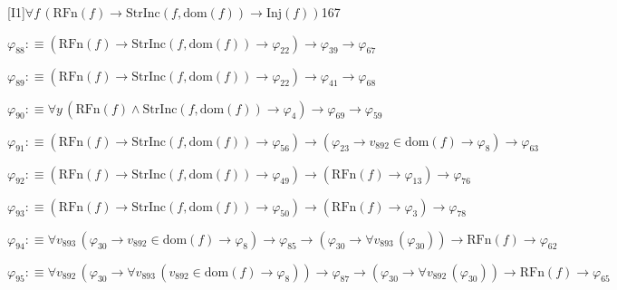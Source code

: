 \begin{fullproof}{[I1]}{$\forall f\,(\mathrm{RFn}(f) \to \mathrm{StrInc}(f,\mathrm{dom}(f)) \to \mathrm{Inj}(f))$}{167}
\begin{abbrevlist}
\item $\varphi_{88} :\equiv (\mathrm{RFn}(f) \to \mathrm{StrInc}(f,\mathrm{dom}(f)) \to \varphi_{22}) \to \varphi_{39} \to \varphi_{67}$
\item $\varphi_{89} :\equiv (\mathrm{RFn}(f) \to \mathrm{StrInc}(f,\mathrm{dom}(f)) \to \varphi_{22}) \to \varphi_{41} \to \varphi_{68}$
\item $\varphi_{90} :\equiv \forall y\,(\mathrm{RFn}(f) \land \mathrm{StrInc}(f,\mathrm{dom}(f)) \to \varphi_{4}) \to \varphi_{69} \to \varphi_{59}$
\item $\varphi_{91} :\equiv (\mathrm{RFn}(f) \to \mathrm{StrInc}(f,\mathrm{dom}(f)) \to \varphi_{56}) \to (\varphi_{23} \to v_{892} \in \mathrm{dom}(f) \to \varphi_{8}) \to \varphi_{63}$
\item $\varphi_{92} :\equiv (\mathrm{RFn}(f) \to \mathrm{StrInc}(f,\mathrm{dom}(f)) \to \varphi_{49}) \to (\mathrm{RFn}(f) \to \varphi_{13}) \to \varphi_{76}$
\item $\varphi_{93} :\equiv (\mathrm{RFn}(f) \to \mathrm{StrInc}(f,\mathrm{dom}(f)) \to \varphi_{50}) \to (\mathrm{RFn}(f) \to \varphi_{3}) \to \varphi_{78}$
\item $\varphi_{94} :\equiv \forall v_{893}\,(\varphi_{30} \to v_{892} \in \mathrm{dom}(f) \to \varphi_{8}) \to \varphi_{85} \to (\varphi_{30} \to \forall v_{893}\,(\varphi_{30})) \to \mathrm{RFn}(f) \to \varphi_{62}$
\item $\varphi_{95} :\equiv \forall v_{892}\,(\varphi_{30} \to \forall v_{893}\,(v_{892} \in \mathrm{dom}(f) \to \varphi_{8})) \to \varphi_{87} \to (\varphi_{30} \to \forall v_{892}\,(\varphi_{30})) \to \mathrm{RFn}(f) \to \varphi_{65}$
\end{abbrevlist}
\end{fullproof}
